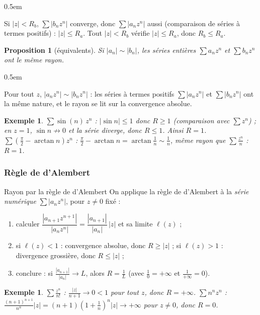\documentclass[a4paper,11pt]{article}
\makeatletter
\numberwithin{equation}{section}
\numberwithin{figure}{section}
\numberwithin{table}{section}
\theoremstyle{enonce}
\newtheorem{proposition}[definition]{Proposition}
\theoremstyle{exemple}
\newtheorem{exemple}[definition]{Exemple}
\theoremstyle{remarque}
\renewcommand{\proofname}{Démonstration}
\renewenvironment{proof}[1][\proofname]{\par\pushQED{\qed}\normalfont
  \topsep0.5em\relax\trivlist\item[\hskip\labelsep\sffamily\itshape\color{Gris}#1.]\ignorespaces}
  {\popQED\endtrivlist\@endpefalse}
\makeatother
\begin{document}
\begin{proof}
Si $|z|<R_b$, $\sum|b_nz^n|$ converge, donc $\sum|a_nz^n|$ aussi (comparaison de séries à termes positifs) : $|z|\leq R_a$. Tout
$|z|<R_b$ vérifie $|z|\leq R_a$, donc $R_b\leq R_a$.
\end{proof}

\begin{proposition}[équivalents]\label{p:equiv}
Si $|a_n|\sim|b_n|$, les séries entières $\sum a_nz^n$ et $\sum b_nz^n$ ont le même rayon.
\end{proposition}

\begin{proof}
Pour tout $z$, $|a_nz^n|\sim|b_nz^n|$ : les séries à termes positifs $\sum|a_nz^n|$ et $\sum|b_nz^n|$ ont la même nature, et le
rayon se lit sur la convergence absolue.
\end{proof}

\begin{exemple}
$\sum\sin(n)\,z^n$ : $|\sin n|\leq1$ donc $R\geq1$ (comparaison avec $\sum z^n$) ; en $z=1$, $\sin n\not\to0$ et la série diverge,
donc $R\leq1$. Ainsi $R=1$.\\
$\sum\left(\frac\pi2-\arctan n\right)z^n$ : $\frac\pi2-\arctan n=\arctan\frac1n\sim\frac1n$, même rayon que $\sum\frac{z^n}n$ : $R=1$.
\end{exemple}

\subsubsection*{Règle de d'Alembert}

\begin{methode}{Rayon par la règle de d'Alembert}\label{m:dalembert}
On applique la règle de d'Alembert à la \emph{série numérique} $\sum|a_nz^n|$, pour $z\neq0$ fixé :
\begin{enumerate}
\item calculer $\dfrac{|a_{n+1}z^{n+1}|}{|a_nz^n|}=\dfrac{|a_{n+1}|}{|a_n|}\,|z|$ et sa limite $\ell(z)$ ;
\item si $\ell(z)<1$ : convergence absolue, donc $R\geq|z|$ ; si $\ell(z)>1$ : divergence grossière, donc $R\leq|z|$ ;
\item conclure : si $\frac{|a_{n+1}|}{|a_n|}\to L$, alors $R=\frac1L$ (avec $\frac10=+\infty$ et $\frac1{+\infty}=0$).
\end{enumerate}
\end{methode}

\begin{exemple}
$\sum\frac{z^n}{n!}$ : $\frac{|z|}{n+1}\to0<1$ pour tout $z$, donc $R=+\infty$. \quad
$\sum n^nz^n$ : $\frac{(n+1)^{n+1}}{n^n}|z|=(n+1)\left(1+\frac1n\right)^n|z|\to+\infty$ pour $z\neq0$, donc $R=0$.
\end{exemple}
\end{document}

